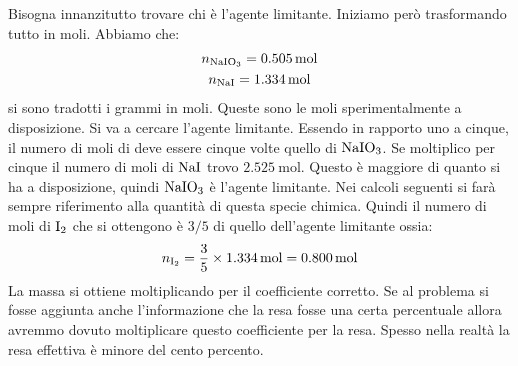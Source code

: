 \documentclass[../AppuntiChimica]{subfiles}
\begin{document}
	\begin{svol}
		Bisogna innanzitutto trovare chi è l'agente limitante. Iniziamo però trasformando tutto in moli. Abbiamo che:
		\begin{gather}
			n_{\text{NaIO}_{3}}=\SI{0.505}{\mole}\\
			n_{\text{NaI}}=\SI{1.334}{\mole}
		\end{gather}
		si sono tradotti i grammi in moli. Queste sono le moli sperimentalmente a disposizione. Si va a cercare l'agente limitante. Essendo in rapporto uno a cinque, il numero di moli di  deve essere cinque volte quello di $ \text{NaIO}_{3} $. Se moltiplico per cinque il numero di moli di $ \text{NaI} $ trovo $ \SI{2.525}{\mole} $. Questo è maggiore di quanto si ha a disposizione, quindi $ \text{NaIO}_{3} $ è l'agente limitante. Nei calcoli seguenti si farà sempre riferimento alla quantità di questa specie chimica. Quindi il numero di moli di $ \text{I}_{2} $ che si ottengono è $ 3/5 $ di quello dell'agente limitante ossia:
		\begin{gather}
		n_{\text{I}_{2}}=\dfrac{3}{5}\times\SI{1.334}{\mole}=\SI{0.800}{\mole}
		\end{gather}
		La massa si ottiene moltiplicando per il coefficiente corretto. Se al problema si fosse aggiunta anche l'informazione che la resa fosse una certa percentuale allora avremmo dovuto moltiplicare questo coefficiente per la resa. Spesso nella realtà la resa effettiva è minore del cento percento.
	\end{svol}
\end{document}
